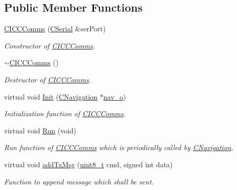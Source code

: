 \subsection*{Public Member Functions}
\begin{DoxyCompactItemize}
\item 
\mbox{\hyperlink{class_c_i_c_c_comms_af2cb9bb6ab473bc5ea2b4aa2f98084ff}{C\+I\+C\+C\+Comms}} (\mbox{\hyperlink{class_c_serial}{C\+Serial}} \&ser\+Port)
\begin{DoxyCompactList}\small\item\em Constructor of \mbox{\hyperlink{class_c_i_c_c_comms}{C\+I\+C\+C\+Comms}}. \end{DoxyCompactList}\item 
\mbox{\hyperlink{class_c_i_c_c_comms_a951ae11fd2024309bd4ecf67981287e7}{$\sim$\+C\+I\+C\+C\+Comms}} ()
\begin{DoxyCompactList}\small\item\em Destructor of \mbox{\hyperlink{class_c_i_c_c_comms}{C\+I\+C\+C\+Comms}}. \end{DoxyCompactList}\item 
virtual void \mbox{\hyperlink{class_c_i_c_c_comms_ad1d35d2145363d2ab970f9f5cd1dfc23}{Init}} (\mbox{\hyperlink{class_c_navigation}{C\+Navigation}} $\ast$\mbox{\hyperlink{_a_d_a_s___nav_u_8ino_a8abc3c3b0c6950fd83525420d5ca0dd2}{nav\+\_\+o}})
\begin{DoxyCompactList}\small\item\em Initialization function of \mbox{\hyperlink{class_c_i_c_c_comms}{C\+I\+C\+C\+Comms}}. \end{DoxyCompactList}\item 
virtual void \mbox{\hyperlink{class_c_i_c_c_comms_a8b3fa81307b3b9ba0e72b4aee8279c56}{Run}} (void)
\begin{DoxyCompactList}\small\item\em Run function of \mbox{\hyperlink{class_c_i_c_c_comms}{C\+I\+C\+C\+Comms}} which is periodically called by \mbox{\hyperlink{class_c_navigation}{C\+Navigation}}. \end{DoxyCompactList}\item 
virtual void \mbox{\hyperlink{class_c_i_c_c_comms_ab925dd7ff82f30ccd9f770ab2281b3ab}{add\+Tx\+Msg}} (\mbox{\hyperlink{_a_d_a_s___types_8h_aba7bc1797add20fe3efdf37ced1182c5}{uint8\+\_\+t}} cmd, signed int data)
\begin{DoxyCompactList}\small\item\em Function to append message which shall be sent. \end{DoxyCompactList}\end{DoxyCompactItemize}

